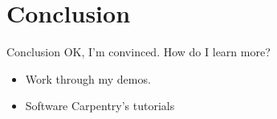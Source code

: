 \documentclass{beamer}
\begin{document}
{ %
    \begin{frame}[plain, label=AEAreg]
     \end{frame}
}

\section{Conclusion}
\begin{frame}{Conclusion}
OK, I'm convinced. How do I learn more?

\begin{itemize}[<.->]
\item Work through my demos.\href{https://github.com/BITSS/SummerInstitute2016}{}
\item Software Carpentry's tutorials \href{http://www.software-carpentry.org/lessons}{}

\end{itemize}
\end{frame}
\end{document}
